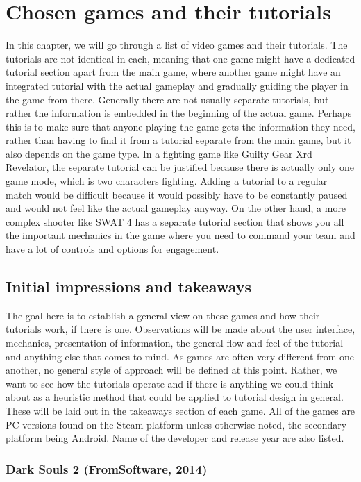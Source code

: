 \chapter{Chosen games and their tutorials}

In this chapter, we will go through a list of video games and their tutorials. The tutorials are not identical in each, meaning that one game might have a dedicated tutorial section apart from the main game, where another game might have an integrated tutorial with the actual gameplay and gradually guiding the player in the game from there. Generally there are not usually separate tutorials, but rather the information is embedded in the beginning of the actual game. Perhaps this is to make sure that anyone playing the game gets the information they need, rather than having to find it from a tutorial separate from the main game, but it also depends on the game type. In a fighting game like Guilty Gear Xrd Revelator, the separate tutorial can be justified because there is actually only one game mode, which is two characters fighting. Adding a tutorial to a regular match would be difficult because it would possibly have to be constantly paused and would not feel like the actual gameplay anyway. On the other hand, a more complex shooter like SWAT 4 has a separate tutorial section that shows you all the important mechanics in the game where you need to command your team and have a lot of controls and options for engagement.
\section{Initial impressions and takeaways}

The goal here is to establish a general view on these games and how their tutorials work, if there is one. Observations will be made about the user interface, mechanics, presentation of information, the general flow and feel of the tutorial and anything else that comes to mind. As games are often very different from one another, no general style of approach will be defined at this point. Rather, we want to see how the tutorials operate and if there is anything we could think about as a heuristic method that could be applied to tutorial design in general. These will be laid out in the takeaways section of each game. All of the games are PC versions found on the Steam platform unless otherwise noted, the secondary platform being Android. Name of the developer and release year are also listed.

\subsection{Dark Souls 2 (FromSoftware, 2014)}
